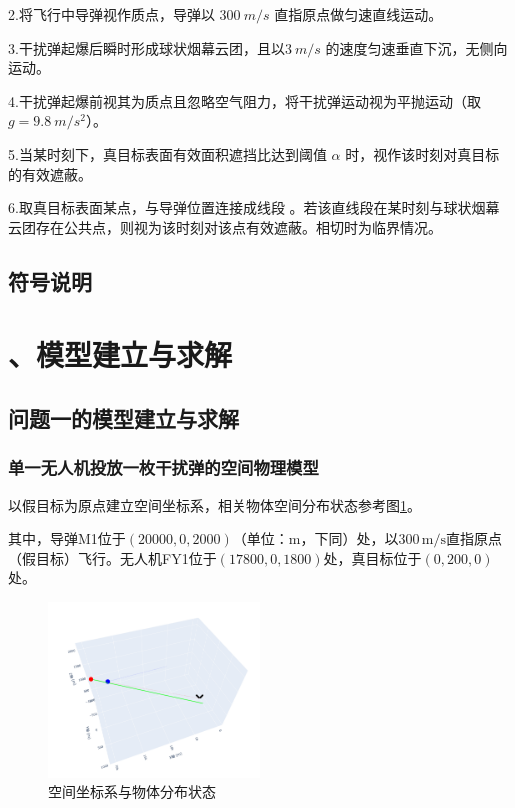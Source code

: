 \documentclass[12pt]{article}
\begin{document}
\begin{CJK}{UTF8}{gbsn}
		2.将飞行中导弹视作质点，导弹以 \(\SI{300}{m/s}\) 直指原点做匀速直线运动。
		
		3.干扰弹起爆后瞬时形成球状烟幕云团，且以\(\SI{3}{m/s}\) 的速度匀速垂直下沉，无侧向运动。
		
		4.干扰弹起爆前视其为质点且忽略空气阻力，将干扰弹运动视为平抛运动（取\(g = \SI{9.8}{m/s^2}\)）。
		
		5.当某时刻下，真目标表面有效面积遮挡比达到阈值 \(\alpha\) 时，视作该时刻对真目标的有效遮蔽。
		
		6.取真目标表面某点，与导弹位置连接成线段 。若该直线段在某时刻与球状烟幕云团存在公共点，则视为该时刻对该点有效遮蔽。相切时为临界情况。
		
		
		
		
		
		\subsection{符号说明}
		
		
		\section{、模型建立与求解}
		
		\subsection{问题一的模型建立与求解}
		
		\subsubsection{单一无人机投放一枚干扰弹的空间物理模型}
		
		以假目标为原点建立空间坐标系，相关物体空间分布状态参考图\ref{fig:spatial_distribution}。
		
		其中，导弹M1位于$(20000,0,2000)$（单位：m，下同）处，以$300\,\mathrm{m/s}$直指原点（假目标）飞行。无人机FY1位于$(17800,0,1800)$处，真目标位于$(0,200,0)$处。
		
		\begin{figure}[H]
			\centering
			\includegraphics[width=0.5\textwidth]{pic/Fg1.png}
			\caption{空间坐标系与物体分布状态}
			\label{fig:spatial_distribution}
		\end{figure}
		

\end{CJK}
\end{document}
